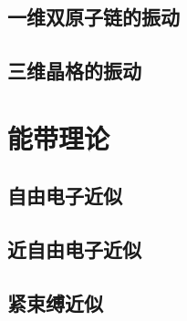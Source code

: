 \section{一维双原子链的振动}
\section{三维晶格的振动}

\chapter{能带理论}
\section{自由电子近似}
\section{近自由电子近似}
\section{紧束缚近似}